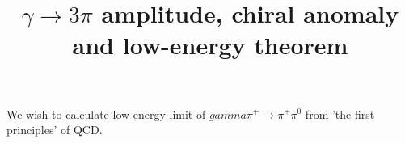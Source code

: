 \documentclass[12 pt]{article}
\title{$\gamma \to 3\pi$ amplitude, chiral anomaly and low-energy theorem}
\date{}
\begin{document}
\maketitle

We wish to calculate low-energy limit of $
gamma\pi^+\to\pi^+\pi^0$ from 'the first principles' of QCD.
\end{document}
